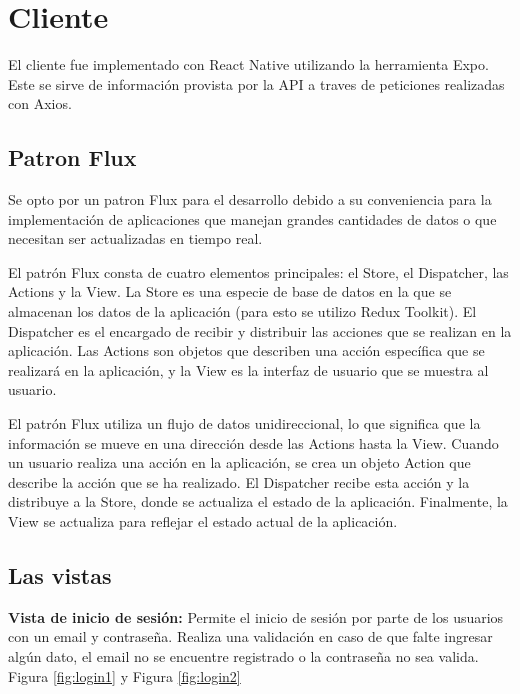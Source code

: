 \newpage
\section{Cliente}
El cliente fue implementado con React Native utilizando la herramienta Expo. Este se sirve de información provista por la API a traves de peticiones realizadas con Axios. 

\subsection{Patron Flux}
Se opto por un patron Flux para el desarrollo debido a su conveniencia para la implementación de aplicaciones que manejan grandes cantidades de datos o que necesitan ser actualizadas en tiempo real.

El patrón Flux consta de cuatro elementos principales: el Store, el Dispatcher, las Actions y la View. La Store es una especie de base de datos en la que se almacenan los datos de la aplicación (para esto se utilizo Redux Toolkit). El Dispatcher es el encargado de recibir y distribuir las acciones que se realizan en la aplicación. Las Actions son objetos que describen una acción específica que se realizará en la aplicación, y la View es la interfaz de usuario que se muestra al usuario.

El patrón Flux utiliza un flujo de datos unidireccional, lo que significa que la información se mueve en una dirección desde las Actions hasta la View. Cuando un usuario realiza una acción en la aplicación, se crea un objeto Action que describe la acción que se ha realizado. El Dispatcher recibe esta acción y la distribuye a la Store, donde se actualiza el estado de la aplicación. Finalmente, la View se actualiza para reflejar el estado actual de la aplicación.



\subsection{Las vistas}

\textbf{Vista de inicio de sesión: }
Permite el inicio de sesión por parte de los usuarios con un email y contraseña. Realiza una validación en caso de que falte ingresar algún dato, el email no se encuentre registrado o la contraseña no sea valida. Figura \ref{fig:login1} y Figura \ref{fig:login2}\\

